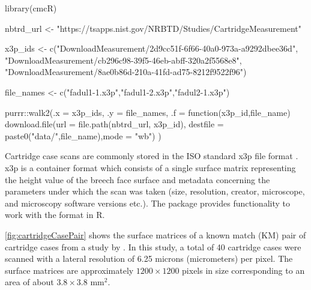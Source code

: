 \begin{Schunk}
\begin{Sinput}
library(cmcR)

nbtrd_url <- "https://tsapps.nist.gov/NRBTD/Studies/CartridgeMeasurement"

x3p_ids <- c("DownloadMeasurement/2d9cc51f-6f66-40a0-973a-a9292dbee36d",
             "DownloadMeasurement/cb296c98-39f5-46eb-abff-320a2f5568e8",
             "DownloadMeasurement/8ae0b86d-210a-41fd-ad75-8212f9522f96")

file_names <- c("fadul1-1.x3p","fadul1-2.x3p","fadul2-1.x3p")

purrr::walk2(.x = x3p_ids,
             .y = file_names,
             .f = function(x3p_id,file_name){
               download.file(url = file.path(nbtrd_url, x3p_id),
                             destfile = paste0("data/",file_name),mode = "wb")
             })
\end{Sinput}
\end{Schunk}

Cartridge case scans are commonly stored in the ISO standard x3p file
format \citep{ISO25178-72}. x3p is a container format which consists of
a single surface matrix representing the height value of the breech face
surface and metadata concerning the parameters under which the scan was
taken (size, resolution, creator, microscope, and microscopy software
versions etc.). The  package \citep{x3ptools} provides
functionality to work with the format in R.

\autoref{fig:cartridgeCasePair} shows the surface matrices of a known
match (KM) pair of cartridge cases from a study by
\citet{fadul_empirical_2011}. In this study, a total of 40 cartridge
cases were scanned with a lateral resolution of 6.25 microns
(micrometers) per pixel. The surface matrices are approximately
\(1200 \times 1200\) pixels in size corresponding to an area of about
\(3.8 \times 3.8\) mm\(^2\).

